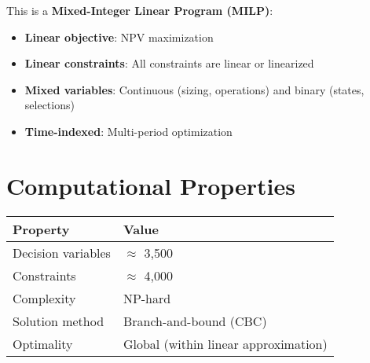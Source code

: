 \documentclass{article}
\begin{document}
This is a \textbf{Mixed-Integer Linear Program (MILP)}:
\begin{itemize}
\item \textbf{Linear objective}: NPV maximization
\item \textbf{Linear constraints}: All constraints are linear or linearized
\item \textbf{Mixed variables}: Continuous (sizing, operations) and binary (states, selections)
\item \textbf{Time-indexed}: Multi-period optimization
\end{itemize}

\section{Computational Properties}
\begin{table}[h]
\centering
\begin{tabular}{ll}
\toprule
Property & Value \\
\midrule
Decision variables & $\approx$ 3,500 \\
Constraints & $\approx$ 4,000 \\
Complexity & NP-hard \\
Solution method & Branch-and-bound (CBC) \\
Optimality & Global (within linear approximation) \\
\bottomrule
\end{tabular}
\end{table}
\end{document}
